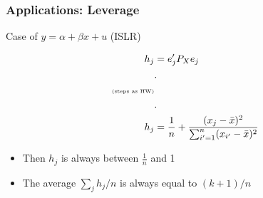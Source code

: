 \documentclass[
  shownotes,
  xcolor={svgnames},
  hyperref={colorlinks,citecolor=DarkBlue,linkcolor=DarkRed,urlcolor=DarkBlue}
  ]{beamer}
\begin{document}
\begin{frame}
\frametitle{Applications: Leverage}
Case of $y=\alpha + \beta x +u$ (ISLR)

\begin{align}
h_j&=e'_j P_X e_j \\
&. \\
 \text{{\tiny (steps as HW)}}  \\
 &. \\
h_j&= \frac{1}{n}+\frac{(x_j-\bar x)^2}{\sum_{i'=1}^n(x_{i'}-\bar x)^2}
\end{align}


\begin{itemize}
\item Then $h_j$ is always between $\frac{1}{n}$ and 1
\item The average $\sum_j h_j/n$ is always equal to $(k+1)/n$
\end{itemize}


\end{frame}
\end{document}
